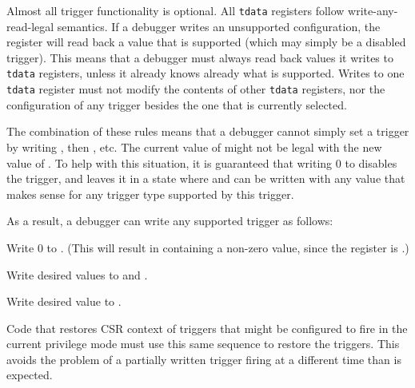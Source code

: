 Almost all trigger functionality is optional. All {\tt tdata} registers follow
write-any-read-legal semantics. If a debugger writes an unsupported
configuration, the register will read back a value that is supported (which may
simply be a disabled trigger).  This means that a debugger must always read
back values it writes to {\tt tdata} registers, unless it already knows already
what is
supported.  Writes to one {\tt tdata} register must not modify the contents of
other {\tt tdata} registers, nor the configuration of any trigger besides the
one that is currently selected.

The combination of these rules means that a debugger cannot simply set a
trigger by writing \RcsrTdataOne, then \RcsrTdataTwo, etc. The current value
of \RcsrTdataTwo might not be legal with the new value of \RcsrTdataOne. To
help with this situation, it is guaranteed that writing 0 to \RcsrTdataOne
disables the trigger, and leaves it in a state where \RcsrTdataTwo and
\RcsrTdataThree can be written with any value that makes sense for any
trigger type supported by this trigger.

\begin{steps}{As a result, a debugger can write any supported trigger as
follows:}
\item Write 0 to \RcsrTdataOne. (This will result in \RcsrTdataOne containing a
    non-zero value, since the register is \warl.)
\item Write desired values to \RcsrTdataTwo and \RcsrTdataThree.
\item Write desired value to \RcsrTdataOne.
\end{steps}

Code that restores CSR context of triggers that might be configured to fire in
the current privilege mode must use this same sequence to restore the triggers.
This avoids the problem of a partially written trigger firing at a different
time than is expected.


